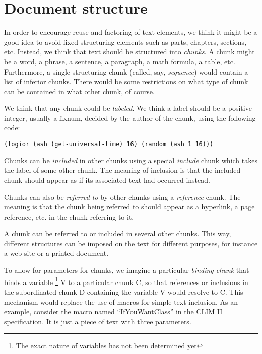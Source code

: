 \chapter{Document structure}
\label{chap-document-structure}

In order to encourage reuse and factoring of text elements, we think
it might be a good idea to avoid fixed structuring elements such as
parts, chapters, sections, etc.  Instead, we think that text should be
structured into \emph{chunks}.  A chunk might be a word, a phrase, a
sentence, a paragraph, a math formula, a table, etc.  Furthermore, a
single structuring chunk (called, say, \emph{sequence}) would contain
a list of inferior chunks.  There would be some restrictions on what
type of chunk can be contained in what other chunk, of course.

We think that any chunk could be \emph{labeled}.  We think a label
should be a positive integer, usually a fixnum, decided by the author
of the chunk, using the following code:

\begin{verbatim}
(logior (ash (get-universal-time) 16) (random (ash 1 16)))
\end{verbatim}

Chunks can be \emph{included} in other chunks using a special
\emph{include} chunk which takes the label of some other chunk.
The meaning of inclusion is that the included chunk should appear as
if its associated text had occurred instead.  

Chunks can also be \emph{referred to} by other chunks using a
\emph{reference} chunk.  The meaning is that the chunk being referred
to should appear as a hyperlink, a page reference, etc. in the chunk
referring to it. 

A chunk can be referred to or included in several other chunks.  This
way, different structures can be imposed on the text for different
purposes, for instance a web site or a printed document. 

To allow for parameters for chunks, we imagine a particular
\emph{binding chunk} that binds a variable%
\footnote{The exact nature of variables has not been determined yet} V
to a particular chunk C, so that references or inclusions in the
subordinated chunk D containing the variable V would resolve to C.
This mechanism would replace the use of macros for simple text
inclusion.  As an example, consider the macro named ``IfYouWantClass''
in the CLIM II specification.  It is just a piece of text with three
parameters.

